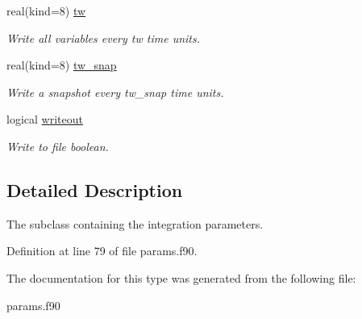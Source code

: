 \begin{DoxyCompactItemize}
real(kind=8) \hyperlink{structparams_1_1integrationparameters_a33a3ac774f065b62c2aa2e44da39537a}{tw}
\begin{DoxyCompactList}\small\item\em Write all variables every tw time units. \end{DoxyCompactList}\item 
\mbox{\label{structparams_1_1integrationparameters_a0b652b1ecf7abd3d54091d885095d409}} 
real(kind=8) \hyperlink{structparams_1_1integrationparameters_a0b652b1ecf7abd3d54091d885095d409}{tw\+\_\+snap}
\begin{DoxyCompactList}\small\item\em Write a snapshot every tw\+\_\+snap time units. \end{DoxyCompactList}\item 
\mbox{\label{structparams_1_1integrationparameters_a04886fca9e3ccef570ea098350846d44}} 
logical \hyperlink{structparams_1_1integrationparameters_a04886fca9e3ccef570ea098350846d44}{writeout}
\begin{DoxyCompactList}\small\item\em Write to file boolean. \end{DoxyCompactList}\end{DoxyCompactItemize}


\subsection{Detailed Description}
The subclass containing the integration parameters. 

Definition at line 79 of file params.\+f90.



The documentation for this type was generated from the following file\+:\begin{DoxyCompactItemize}
\item 
params.\+f90\end{DoxyCompactItemize}

